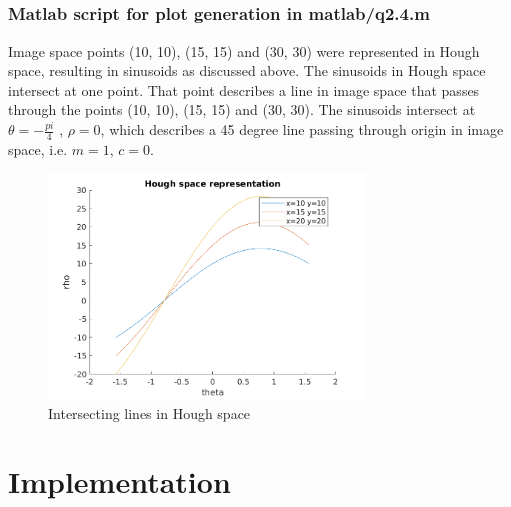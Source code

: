 \documentclass[12pt]{article}
\begin{document}
\newpage
\subsection{}
\subsubsection{Matlab script for plot generation in matlab/q2.4.m}
Image space points (10, 10), (15, 15) and (30, 30) were represented in Hough space, resulting in sinusoids as discussed above. The sinusoids in Hough space intersect at one point. That point describes a line in image space that passes through the points (10, 10), (15, 15) and (30, 30). The sinusoids intersect at $\theta = - \frac{pi}{4}$ , $\rho = 0$, which describes a 45 degree line passing through origin in image space, i.e. $m=1$, $c=0$.



\begin{figure}[H]
\centering
\includegraphics[page=1,width=0.75\textwidth]{q2_4}
\caption{Intersecting lines in Hough space}    
\label{fig:bblr}
\end{figure}   

\newpage
\section{Implementation}
\subsection{}
\newpage
\subsection{}
\newpage
\subsection{}
\newpage
\end{document}
